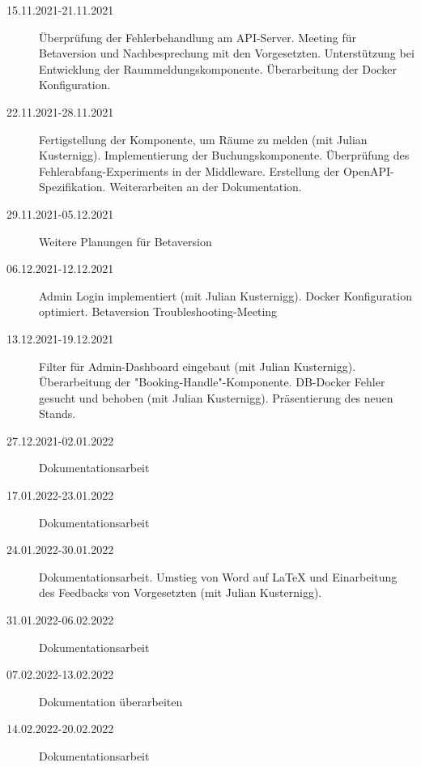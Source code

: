 \begin{description}
    \item[15.11.2021-21.11.2021] Überprüfung der Fehlerbehandlung am API-Server. Meeting für Betaversion und Nachbesprechung mit den Vorgesetzten. Unterstützung bei Entwicklung der Raummeldungskomponente. Überarbeitung der Docker Konfiguration.
    \item[22.11.2021-28.11.2021] Fertigstellung der Komponente, um Räume zu melden (mit Julian Kusternigg). Implementierung der Buchungskomponente. Überprüfung des Fehlerabfang-Experiments in der Middleware.
    Erstellung der OpenAPI-Spezi\-fikation. Weiterarbeiten an der Dokumentation.
    \item[29.11.2021-05.12.2021] Weitere Planungen für Betaversion
    \item[06.12.2021-12.12.2021] Admin Login implementiert (mit Julian Kusternigg). Docker Konfiguration optimiert. Betaversion Troubleshooting-Meeting
    \item[13.12.2021-19.12.2021] Filter für Admin-Dashboard eingebaut (mit Julian Kusternigg). Überarbeitung der "Booking-Handle"-Komponente. DB-Docker Fehler gesucht und behoben (mit Julian Kusternigg). Präsentierung des neuen Stands.
    \item[27.12.2021-02.01.2022] Dokumentationsarbeit 
    \item[17.01.2022-23.01.2022] Dokumentationsarbeit
    \item[24.01.2022-30.01.2022] Dokumentationsarbeit. Umstieg von Word auf LaTeX und Einarbeitung des Feedbacks von Vorgesetzten (mit Julian Kusternigg). 
    \item[31.01.2022-06.02.2022] Dokumentationsarbeit
    \item[07.02.2022-13.02.2022] Dokumentation überarbeiten
    \item[14.02.2022-20.02.2022] Dokumentationsarbeit 
\end{description}